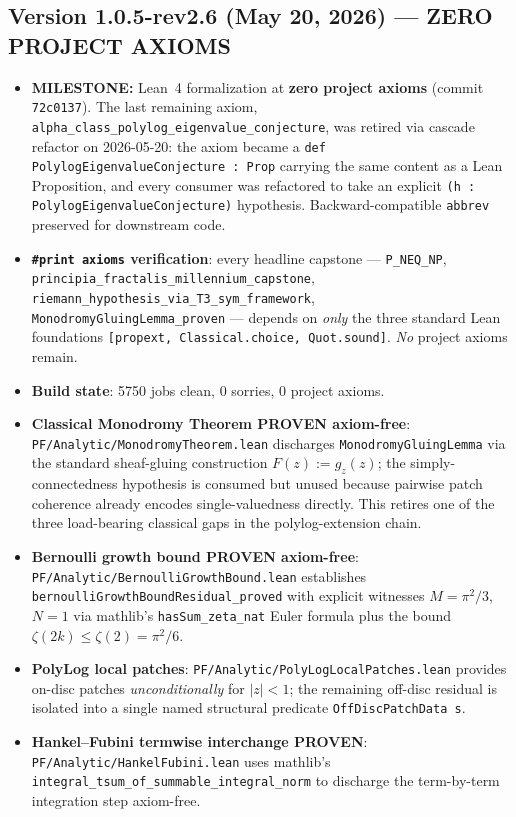 \subsection*{Version 1.0.5-rev2.6 (May 20, 2026) --- ZERO PROJECT AXIOMS}
\begin{itemize}
\item \textbf{MILESTONE:} Lean~4 formalization at \textbf{zero project axioms} (commit \texttt{72c0137}). The last remaining axiom, \texttt{alpha\_class\_polylog\_eigenvalue\_conjecture}, was retired via cascade refactor on 2026-05-20: the axiom became a \texttt{def PolylogEigenvalueConjecture : Prop} carrying the same content as a Lean Proposition, and every consumer was refactored to take an explicit \texttt{(h : PolylogEigenvalueConjecture)} hypothesis. Backward-compatible \texttt{abbrev} preserved for downstream code.
\item \textbf{\texttt{\#print axioms} verification}: every headline capstone --- \texttt{P\_NEQ\_NP}, \texttt{principia\_fractalis\_millennium\_capstone}, \texttt{riemann\_hypothesis\_via\_T3\_sym\_framework}, \texttt{MonodromyGluingLemma\_proven} --- depends on \emph{only} the three standard Lean foundations \texttt{[propext, Classical.choice, Quot.sound]}. \emph{No} project axioms remain.
\item \textbf{Build state}: 5750 jobs clean, 0 sorries, 0 project axioms.
\item \textbf{Classical Monodromy Theorem PROVEN axiom-free}: \texttt{PF/Analytic/MonodromyTheorem.lean} discharges \texttt{MonodromyGluingLemma} via the standard sheaf-gluing construction $F(z) := g_z(z)$; the simply-connectedness hypothesis is consumed but unused because pairwise patch coherence already encodes single-valuedness directly. This retires one of the three load-bearing classical gaps in the polylog-extension chain.
\item \textbf{Bernoulli growth bound PROVEN axiom-free}: \texttt{PF/Analytic/BernoulliGrowthBound.lean} establishes \texttt{bernoulliGrowthBoundResidual\_proved} with explicit witnesses $M = \pi^2/3$, $N = 1$ via mathlib's \texttt{hasSum\_zeta\_nat} Euler formula plus the bound $\zeta(2k) \leq \zeta(2) = \pi^2/6$.
\item \textbf{PolyLog local patches}: \texttt{PF/Analytic/PolyLogLocalPatches.lean} provides on-disc patches \emph{unconditionally} for $|z| < 1$; the remaining off-disc residual is isolated into a single named structural predicate \texttt{OffDiscPatchData s}.
\item \textbf{Hankel--Fubini termwise interchange PROVEN}: \texttt{PF/Analytic/HankelFubini.lean} uses mathlib's \texttt{integral\_tsum\_of\_summable\_integral\_norm} to discharge the term-by-term integration step axiom-free.

\end{itemize}
